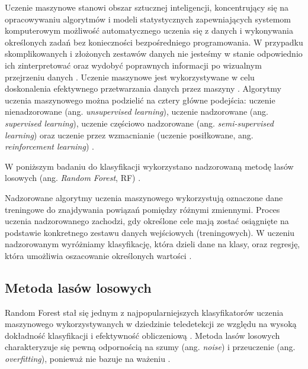 \documentclass{amuthesis}
\begin{document}
Uczenie maszynowe stanowi obszar sztucznej inteligencji, koncentrujący
się na opracowywaniu algorytmów i modeli statystycznych zapewniających
systemom komputerowym możliwość automatycznego uczenia się z danych i
wykonywania określonych zadań bez konieczności bezpośredniego
programowania. W przypadku skomplikowanych i złożonych zestawów danych
nie jesteśmy w stanie odpowiednio ich zinterpretować oraz wydobyć
poprawnych informacji po wizualnym przejrzeniu danych
\autocite{mahesh_2019_ml}. Uczenie maszynowe jest wykorzystywane w celu
doskonalenia efektywnego przetwarzania danych przez maszyny
\autocite{sindayigaya_2022_ml}. Algorytmy uczenia maszynowego można
podzielić na cztery główne podejścia: uczenie nienadzorowane (ang.
\emph{unsupervised learning}), uczenie nadzorowane (ang.
\emph{supervised learning}), uczenie częściowo nadzorowane (ang.
\emph{semi-supervised learning}) oraz uczenie przez wzmacnianie (uczenie
posiłkowane, ang. \emph{reinforcement learning})
\autocite{sarker_2021_ml}.

W poniższym badaniu do klasyfikacji wykorzystano nadzorowaną metodę
lasów losowych (ang. \emph{Random Forest}, RF)
\autocite{breiman_2001_rf}.

Nadzorowane algorytmy uczenia maszynowego wykorzystują oznaczone dane
treningowe do znajdywania powiązań pomiędzy różnymi zmiennymi. Proces
uczenia nadzorowanego zachodzi, gdy określone cele mają zostać
osiągnięte na podstawie konkretnego zestawu danych wejściowych
(treningowych). W uczeniu nadzorowanym wyróżniamy klasyfikację, która
dzieli dane na klasy, oraz regresję, która umożliwia oszacowanie
określonych wartości \autocite{sarker_2021_ml}.

\hypertarget{sec-random-forest}{%
\subsection{Metoda lasów losowych}\label{sec-random-forest}}

Random Forest stał się jednym z najpopularniejszych klasyfikatorów
uczenia maszynowego wykorzystywanych w dziedzinie teledetekcji ze
względu na wysoką dokładność klasyfikacji i efektywność obliczeniową
\autocite{belgiu_2016_rf,sheykhmousa_2020_svm_vs_rf}. Metoda lasów
losowych charakteryzuje się pewną odpornością na szumy (ang.
\emph{noise}) i przeuczenie (ang. \emph{overfitting}), ponieważ nie
bazuje na ważeniu \autocite{gislason_2006_rf}.
\end{document}
